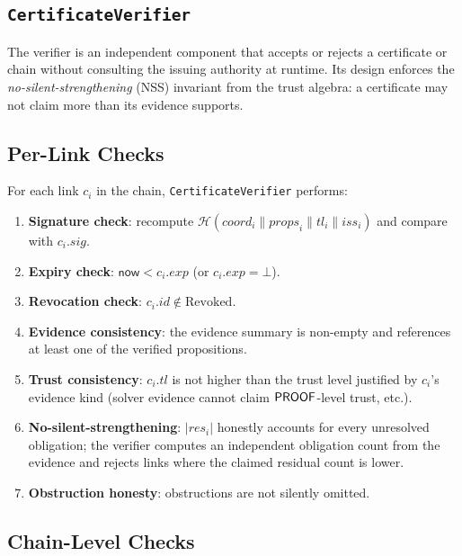 \documentclass[11pt]{article}
\makeatletter
\newcommand{\certid}{\mathit{id}}              %
\newcommand{\certcoord}{\mathit{coord}}        %
\newcommand{\certprops}{\mathit{props}}        %
\newcommand{\certtrust}{\mathit{tl}}           %
\newcommand{\certissuer}{\mathit{iss}}         %
\newcommand{\certsig}{\mathit{sig}}            %
\newcommand{\certresid}{\mathit{res}}          %
\newcommand{\certexpiry}{\mathit{exp}}         %
\newcommand{\Revoked}{\mathrm{Revoked}}        %
\newcommand{\Sigalg}{\mathcal{H}}              %
\newcommand{\etc}{etc.\@\xspace}
\makeatother
\begin{document}
\subsection{\texttt{CertificateVerifier}}

The verifier is an independent component that accepts or rejects a
certificate or chain without consulting the issuing authority at runtime.
Its design enforces the \emph{no-silent-strengthening} (NSS) invariant
from the \JuGeo{} trust algebra: a certificate may not claim more than
its evidence supports.

\subsection{Per-Link Checks}

For each link $c_i$ in the chain, \texttt{CertificateVerifier} performs:

\begin{enumerate}[leftmargin=2em,label=(\roman*)]
  \item \textbf{Signature check}: recompute $\Sigalg(\certcoord_i \| \certprops_i \| \certtrust_i \| \certissuer_i)$ and compare with $c_i.\certsig$.
  \item \textbf{Expiry check}: $\mathsf{now} < c_i.\certexpiry$ (or $c_i.\certexpiry = \bot$).
  \item \textbf{Revocation check}: $c_i.\certid \notin \Revoked$.
  \item \textbf{Evidence consistency}: the evidence summary is non-empty and
        references at least one of the verified propositions.
  \item \textbf{Trust consistency}: $c_i.\certtrust$ is not higher than the
        trust level justified by $c_i$'s evidence kind (solver evidence cannot
        claim $\mathsf{PROOF}$-level trust, \etc).
  \item \textbf{No-silent-strengthening}: $|\certresid_i|$ honestly accounts for
        every unresolved obligation; the verifier computes an independent
        obligation count from the evidence and rejects links where the
        claimed residual count is lower.
  \item \textbf{Obstruction honesty}: obstructions are not silently omitted.
\end{enumerate}

\subsection{Chain-Level Checks}
\end{document}
